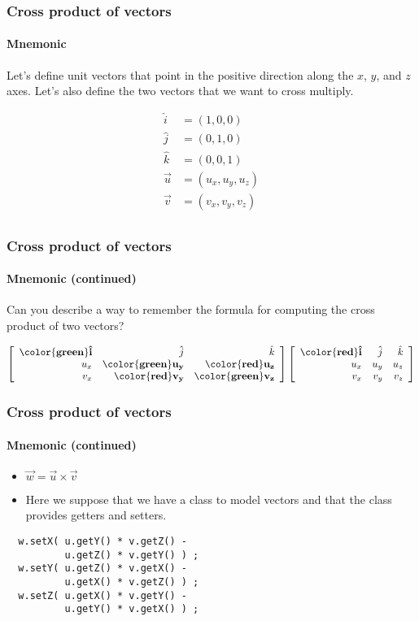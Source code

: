 \documentclass[xcolor=dvipsnames]{beamer}
\begin{document}
\begin{frame}
\frametitle{Cross product of vectors}
\framesubtitle{Mnemonic}

  Let's define unit vectors that point in the positive
  direction along the $x$, $y$, and $z$ axes.
  Let's also define the two vectors that we want to 
  cross multiply.

  \begin{align*}
    \hat{i} & = (1, 0, 0) \\
    \hat{j} & = (0, 1, 0) \\
    \hat{k} & = (0, 0, 1) \\
    \vec{u} & = (u_x, u_y, u_z) \\
    \vec{v} & = (v_x, v_y, v_z) \\
    \end{align*}
  \end{frame}

\begin{frame}
\frametitle{Cross product of vectors}
\framesubtitle{Mnemonic (continued)}

  Can you describe a way to remember the
  formula for computing the cross product
  of two vectors?

  \begin{align*}
    \left[ \begin{array}{rrr}
      \mathbf{\color{green} \hat{i}} & \hat{j} & \hat{k} \\
      u_x & \mathbf{\color{green} u_y} & \mathbf{\color{red} u_z} \\
      v_x & \mathbf{\color{red} v_y} & \mathbf{\color{green} v_z} 
      \end{array} \right]
    \left[ \begin{array}{rrr}
      \mathbf{\color{red} \hat{i}} & \hat{j} & \hat{k} \\
      u_x & u_y & u_z \\
      v_x & v_y & v_z 
      \end{array} \right]
    \end{align*}
  \end{frame}

\begin{frame}[fragile]
\frametitle{Cross product of vectors}
\framesubtitle{Mnemonic (continued)}

  \begin{itemize}
    \item $\vec{w} = \vec{u} \times \vec{v}$
    \item Here we suppose that we have a class to model vectors
      and that the class provides getters and setters.
    \end{itemize}

\begin{lstlisting}
  w.setX( u.getY() * v.getZ() - 
          u.getZ() * v.getY() ) ;
  w.setY( u.getZ() * v.getX() - 
          u.getX() * v.getZ() ) ;
  w.setZ( u.getX() * v.getY() - 
          u.getY() * v.getX() ) ;
  \end{lstlisting}

\end{frame}
\end{document}

